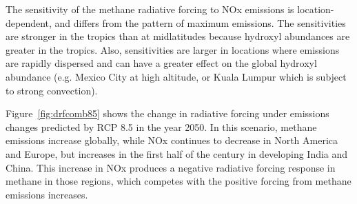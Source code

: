 The sensitivity of the methane radiative forcing to NOx emissions is location-dependent, and differs from the pattern of maximum emissions. The sensitivities are stronger in the tropics than at midlatitudes because hydroxyl abundances are greater in the tropics. Also, sensitivities are larger in locations where emissions are rapidly dispersed and can have a greater effect on the global hydroxyl abundance (e.g. Mexico City at high altitude, or Kuala Lumpur which is subject to strong convection).

Figure~\ref{fig:drfcomb85} shows the change in radiative forcing under emissions changes predicted by RCP 8.5 in the year 2050. In this scenario, methane emissions increase globally, while NOx continues to decrease in North America and Europe, but increases in the first half of the century in developing India and China. This increase in NOx produces a negative radiative forcing response in methane in those regions, which competes with the positive forcing from methane emissions increases.